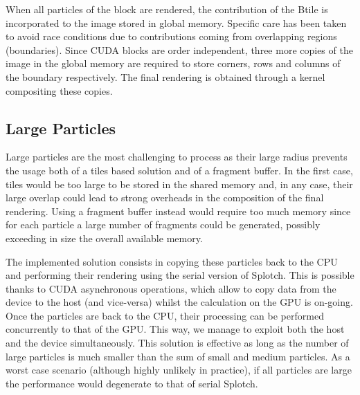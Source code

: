 \documentclass[1p]{elsarticle}
\begin{document}
When all particles of the block are rendered, the contribution of the Btile is incorporated to the image stored in global memory. Specific care has been taken to avoid race conditions due to contributions coming
from overlapping regions (boundaries). Since CUDA blocks are order independent, three more copies of the image in the global memory are required to store corners, rows and columns of the boundary respectively. The final rendering is obtained through a kernel compositing these copies. 

\subsection{Large Particles}
\label{sec:largeparticles}
Large particles are the most challenging to process as their large
radius prevents the usage both of a tiles based solution and of a fragment buffer.
In the first case, tiles would be too large to be stored in the shared memory
and, in any case, their large overlap could lead to strong overheads in the composition of the
final rendering. Using a fragment buffer instead would require too much memory since
for each particle a large number of fragments could be generated, possibly
exceeding in size the overall available memory.

The implemented solution consists in copying these particles back to the CPU and performing their rendering
using the serial version of Splotch. This is possible thanks to CUDA asynchronous
operations, which allow to copy data from the device to the host (and vice-versa)
whilst the calculation on the GPU is on-going. Once the particles are back to the CPU,
their processing can be performed concurrently to that of the GPU.  
This way, we manage to exploit both the host and the device simultaneously.
This solution is effective as long as the number of large particles
is much smaller than the sum of small and medium particles. As a worst case scenario (although highly unlikely in practice), if all particles are large the performance would degenerate to that of serial Splotch.
\end{document}
